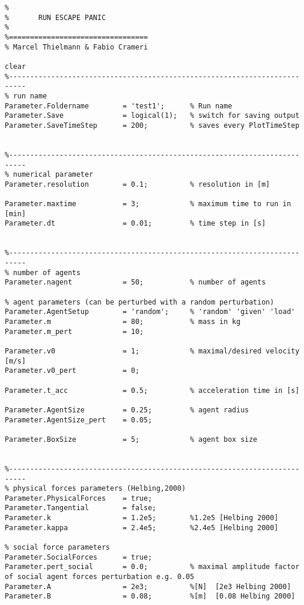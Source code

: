 \lstset{basicstyle=\footnotesize\ttfamily}
    
\begin{lstlisting}[breaklines]
%=================================
%
%       RUN ESCAPE PANIC
% 
%=================================
% Marcel Thielmann & Fabio Crameri

clear
%--------------------------------------------------------------------------
% run name
Parameter.Foldername        = 'test1';      % Run name
Parameter.Save              = logical(1);   % switch for saving output
Parameter.SaveTimeStep      = 200;          % saves every PlotTimeStep


%--------------------------------------------------------------------------
% numerical parameter
Parameter.resolution        = 0.1;          % resolution in [m]

Parameter.maxtime           = 3;            % maximum time to run in [min]
Parameter.dt                = 0.01;         % time step in [s]


%--------------------------------------------------------------------------
% number of agents
Parameter.nagent            = 50;           % number of agents

% agent parameters (can be perturbed with a random perturbation)
Parameter.AgentSetup        = 'random';     % 'random' 'given' 'load'
Parameter.m                 = 80;           % mass in kg
Parameter.m_pert            = 10;

Parameter.v0                = 1;            % maximal/desired velocity [m/s]
Parameter.v0_pert           = 0;   

Parameter.t_acc             = 0.5;        	% acceleration time in [s]

Parameter.AgentSize         = 0.25;         % agent radius
Parameter.AgentSize_pert    = 0.05; 

Parameter.BoxSize           = 5;            % agent box size


%--------------------------------------------------------------------------
% physical forces parameters (Helbing,2000)
Parameter.PhysicalForces    = true;
Parameter.Tangential        = false;
Parameter.k                 = 1.2e5;        %1.2e5 [Helbing 2000]
Parameter.kappa             = 2.4e5;        %2.4e5 [Helbing 2000]

% social force parameters
Parameter.SocialForces      = true;
Parameter.pert_social       = 0.0;          % maximal amplitude factor of social agent forces perturbation e.g. 0.05
Parameter.A                 = 2e3;          %[N]  [2e3 Helbing 2000]
Parameter.B                 = 0.08;         %[m]  [0.08 Helbing 2000]


\end{lstlisting}
